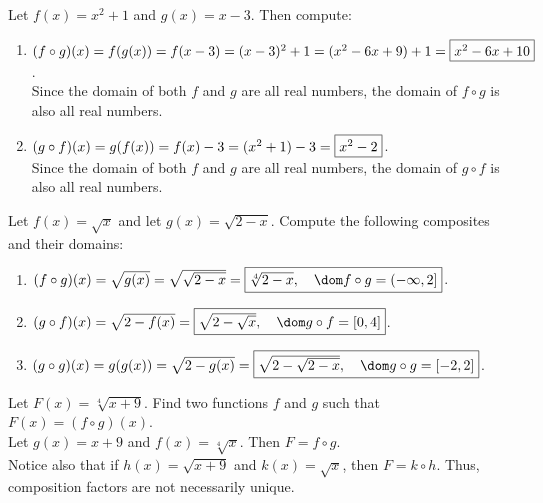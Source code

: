 \documentclass{book}
\begin{document}
\begin{Exam} Let $f(x) = x^2+1$ and $g(x) = x-3$. Then compute:\\
\begin{enumerate}
\item $(f\circ g)(x) = f(g(x)) = f(x-3) = (x-3)^2 +1 = (x^2-6x+9)+1 = \fbox{$x^2-6x+10$}$.\\ 

Since the domain of both $f$ and $g$ are all real numbers, the domain of $f\circ g$ is also all real numbers.\\

\item $(g\circ f)(x) = g(f(x)) = f(x) - 3 = (x^2+1)-3 = \fbox{$x^2-2$}$.\\

Since the domain of both $f$ and $g$ are all real numbers, the domain of $g\circ f$ is also all real numbers.
\end{enumerate}
\end{Exam}\vs

\begin{Exam} Let $f(x) = \sqrt{x}$ and let $g(x) = \sqrt{2-x}$. Compute the following composites and their domains:
\begin{enumerate}
\item $(f\circ g)(x) = \sqrt{g(x)} = \sqrt{\sqrt{2-x}} = \fbox{$\sqrt[4]{2-x},\quad \dom f\circ g = (-\infty, 2]$}$.\\

\item $(g\circ f)(x) = \sqrt{2-f(x)} = \fbox{$\sqrt{2-\sqrt{x}},\quad \dom g\circ f = [0,4]$}$.\\

\item $(g\circ g)(x) =  g(g(x)) = \sqrt{2-g(x)} = \fbox{$\sqrt{2-\sqrt{2-x}},\quad \dom g\circ g = [-2,2]$}$.\\
\end{enumerate}
\end{Exam}\vs

\begin{Exam} Let $F(x) = \sqrt[4]{x+9}$. Find two functions $f$ and $g$ such that $F(x) = (f\circ g)(x)$.\\

Let $g(x) = x+9$ and $f(x) = \sqrt[4]{x}$. Then $F = f\circ g$.\\

Notice also that  if $h(x) = \sqrt{x+9}$ and $k(x) = \sqrt{x}$, then $F = k\circ h$. Thus, composition factors are not necessarily unique. 
\end{Exam}\vs
\end{document}
